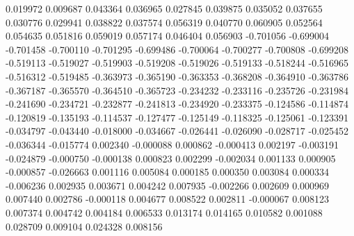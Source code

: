 0.019972
0.009687
0.043364
0.036965
0.027845
0.039875
0.035052
0.037655
0.030776
0.029941
0.038822
0.037574
0.056319
0.040770
0.060905
0.052564
0.054635
0.051816
0.059019
0.057174
0.046404
0.056903
-0.701056
-0.699004
-0.701458
-0.700110
-0.701295
-0.699486
-0.700064
-0.700277
-0.700808
-0.699208
-0.519113
-0.519027
-0.519903
-0.519208
-0.519026
-0.519133
-0.518244
-0.516965
-0.516312
-0.519485
-0.363973
-0.365190
-0.363353
-0.368208
-0.364910
-0.363786
-0.367187
-0.365570
-0.364510
-0.365723
-0.234232
-0.233116
-0.235726
-0.231984
-0.241690
-0.234721
-0.232877
-0.241813
-0.234920
-0.233375
-0.124586
-0.114874
-0.120819
-0.135193
-0.114537
-0.127477
-0.125149
-0.118325
-0.125061
-0.123391
-0.034797
-0.043440
-0.018000
-0.034667
-0.026441
-0.026090
-0.028717
-0.025452
-0.036344
-0.015774
0.002340
-0.000088
0.000862
-0.000413
0.002197
-0.003191
-0.024879
-0.000750
-0.000138
0.000823
0.002299
-0.002034
0.001133
0.000905
-0.000857
-0.026663
0.001116
0.005084
0.000185
0.000350
0.003084
0.000334
-0.006236
0.002935
0.003671
0.004242
0.007935
-0.002266
0.002609
0.000969
0.007440
0.002786
-0.000118
0.004677
0.008522
0.002811
-0.000067
0.008123
0.007374
0.004742
0.004184
0.006533
0.013174
0.014165
0.010582
0.001088
0.028709
0.009104
0.024328
0.008156
